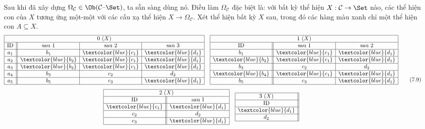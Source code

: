 Sau khi đã xây dựng $\Omega_{\mathcal C}\in\Ob(\mathcal C\text{--}\Set)$, ta sẵn sàng dùng nó. Điều làm $\Omega_{\mathcal C}$ đặc biệt là: với bất kỳ thể hiện $X:\mathcal C\to\Set$ nào, các thể hiện con của $X$ tương ứng một-một với các cấu xạ thể hiện $X\to\Omega_{\mathcal C}$. Xét thể hiện bất kỳ $X$ sau, trong đó các hàng màu xanh chỉ một thể hiện con $A\subseteq X$.
\begin{equation}
\begin{gathered}
\begin{array}{|c||c|c|c|}\hline\multicolumn{4}{|c|}{0\ (X)}\\\hline\text{ID}&\text{sau 1}&\text{sau 2}&\text{sau 3}\\\hline
a_1&b_1&\textcolor{blue}{c_1}&\textcolor{blue}{d_1}\\\hline
a_2&\textcolor{blue}{b_2}&\textcolor{blue}{c_1}&\textcolor{blue}{d_1}\\\hline
a_3&\textcolor{blue}{b_2}&\textcolor{blue}{c_1}&\textcolor{blue}{d_1}\\\hline
a_4&b_3&c_2&d_2\\\hline
a_5&b_5&c_3&\textcolor{blue}{d_1}\\\hline\end{array}\quad
\begin{array}{|c||c|c|}\hline\multicolumn{3}{|c|}{1\ (X)}\\\hline\text{ID}&\text{sau 1}&\text{sau 2}\\\hline
b_1&\textcolor{blue}{c_1}&\textcolor{blue}{d_1}\\\hline
\textcolor{blue}{b_2}&\textcolor{blue}{c_1}&\textcolor{blue}{d_1}\\\hline
b_3&c_2&d_2\\\hline
\textcolor{blue}{b_4}&\textcolor{blue}{c_1}&\textcolor{blue}{d_1}\\\hline
b_5&c_3&\textcolor{blue}{d_1}\\\hline\end{array}\\[1ex]
\begin{array}{|c||c|}\hline\multicolumn{2}{|c|}{2\ (X)}\\\hline\text{ID}&\text{sau 1}\\\hline
\textcolor{blue}{c_1}&\textcolor{blue}{d_1}\\\hline c_2&d_2\\\hline c_3&\textcolor{blue}{d_1}\\\hline\end{array}\quad
\begin{array}{|c||}\hline3\ (X)\\\hline\text{ID}\\\hline\textcolor{blue}{d_1}\\\hline d_2\\\hline\end{array}
\end{gathered}\tag{7.9}
\end{equation}

